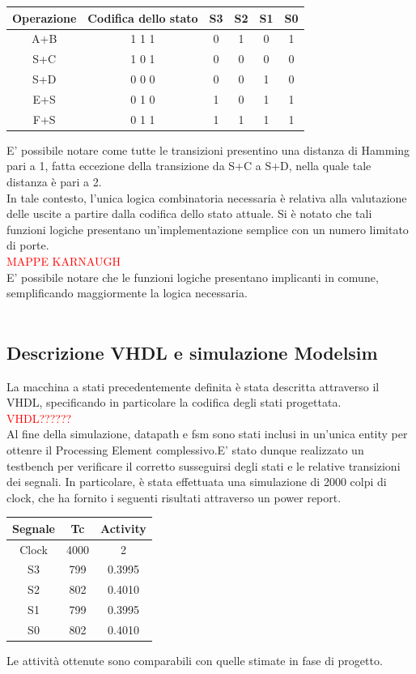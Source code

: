 \documentclass[11pt,  english, makeidx, a4paper, titlepage, oneside]{book}
\begin{document}
\begin{center}
	\begin{tabular}{|c||c||c|c|c|c|}
	\hline
	Operazione & Codifica dello stato & S3 & S2 & S1 & S0 \\ 
	\hline
	A+B & 1 1 1 & 0 & 1 & 0 & 1 \\
	\hline
	S+C & 1 0 1 & 0 & 0 & 0 & 0 \\
	\hline
	S+D & 0 0 0 & 0 & 0 & 1 & 0 \\
	\hline
	E+S & 0 1 0 & 1 & 0 & 1 & 1 \\
	\hline
	F+S & 0 1 1 & 1 & 1 & 1 & 1 \\
	\hline
	\end{tabular}	
\end{center}
\vspace{0.3cm}  
E' possibile notare come tutte le transizioni presentino una distanza di Hamming pari a 1, fatta eccezione della transizione da S+C a S+D, nella quale tale distanza è pari a 2.
\\
In tale contesto, l'unica logica combinatoria necessaria è relativa alla valutazione delle uscite a partire dalla codifica dello stato attuale. Si è notato che tali funzioni logiche presentano un'implementazione semplice con un numero limitato di porte.
\\
\textcolor{red}{MAPPE KARNAUGH}
\\
E' possibile notare che le funzioni logiche presentano implicanti in comune, semplificando maggiormente la logica necessaria.
\\\\
\subsection{Descrizione VHDL e simulazione Modelsim}
La macchina a stati precedentemente definita è stata descritta attraverso il VHDL, specificando in particolare la codifica degli stati progettata.
\\
\textcolor{red}{VHDL??????}
\\
Al fine della simulazione, datapath e fsm sono stati inclusi in un'unica entity per ottenre il Processing Element complessivo.E' stato dunque realizzato un testbench per verificare il corretto susseguirsi degli stati e le relative transizioni dei segnali.
In particolare, è stata effettuata una simulazione di 2000 colpi di clock, che ha fornito i seguenti risultati attraverso un power report.
\begin{center}
	\begin{tabular}{|c|c|c|}
	\hline
	Segnale & Tc & Activity \\ 
	\hline
	Clock & 4000 & 2 \\
	\hline
	S3 & 799 & 0.3995 \\
	\hline
	S2 & 802 & 0.4010 \\
	\hline
	S1 & 799 & 0.3995 \\
	\hline
	S0 & 802 & 0.4010 \\
	\hline
	\end{tabular}	
\end{center}
\vspace{0.3cm}  
Le attività ottenute sono comparabili con quelle stimate in fase di progetto.  
\\
\end{document}
